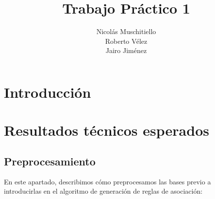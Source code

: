 \documentclass[]{article}
\title{Trabajo Práctico 1}
\author{Nicolás Muschitiello \\
	Roberto Vélez\\
	Jairo Jiménez
	}
\begin{document}
\maketitle

\section{Introducción}




\section{Resultados técnicos esperados}
\subsection{Preprocesamiento}
En este apartado, describimos cómo preprocesamos las bases previo a introducirlas en el algoritmo de generación de reglas de asociación:\\
\end{document}
